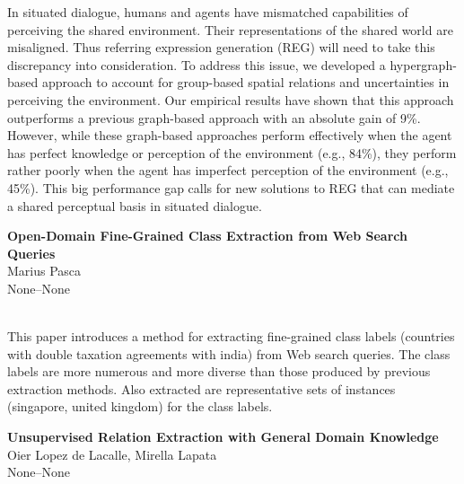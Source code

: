 \documentclass[twoside,makeidx]{book}
\begin{document}
\nopagebreak%
\noindent%
{\small In situated dialogue, humans and agents have mismatched capabilities of perceiving the shared environment. Their representations of the shared world are misaligned. Thus referring expression generation (REG) will need to take this discrepancy into consideration. To address this issue, we developed a hypergraph-based approach to account for group-based spatial relations and uncertainties in perceiving the environment. Our empirical results have shown that this approach outperforms a previous graph-based approach with an absolute gain of 9\%. However, while these graph-based approaches perform effectively when the agent has perfect knowledge or perception of the environment (e.g., 84\%), they perform rather poorly when the agent has imperfect perception of the environment (e.g., 45\%). This big performance gap calls for new solutions to REG that can mediate a shared perceptual basis in situated dialogue.}
\par\vspace{2em}\noindent%
\begin{minipage}{\linewidth}%
\begin{center}
\textbf{\normalsize Open-Domain Fine-Grained Class Extraction from Web Search Queries}\\
\normalsize  Marius Pasca\\
{\small None--None}\\
\end{center}
\end{minipage}\\[0.5em]
\nopagebreak%
\noindent%
{\small This paper introduces a method for extracting fine-grained class labels (countries with double taxation agreements with india) from Web search queries. The class labels are more numerous and more diverse than those produced by previous extraction methods. Also extracted are representative sets of instances (singapore, united kingdom) for the class labels.}
\par\vspace{2em}\noindent%
\begin{minipage}{\linewidth}%
\begin{center}
\textbf{\normalsize Unsupervised Relation Extraction with General Domain Knowledge}\\
\normalsize  Oier Lopez de Lacalle,  Mirella Lapata\\
{\small None--None}\\
\end{center}
\end{minipage}\\[0.5em]
\end{document}
